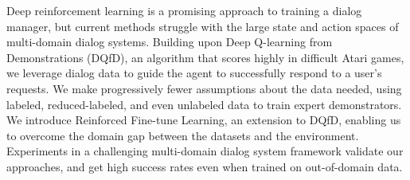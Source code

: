 Deep reinforcement learning is a promising approach to training a dialog manager, but current methods struggle with the large state and action spaces of multi-domain dialog systems. Building upon Deep Q-learning from Demonstrations (DQfD), an algorithm that scores highly in difficult Atari games, we leverage dialog data to guide the agent to successfully respond to a user's requests. We make progressively fewer assumptions about the data needed, using labeled, reduced-labeled, and even unlabeled data to train expert demonstrators. We introduce Reinforced Fine-tune Learning, an extension to DQfD, enabling us to overcome the domain gap between the datasets and the environment. Experiments in a challenging multi-domain dialog system framework validate our approaches, and get high success rates even when trained on out-of-domain data.
